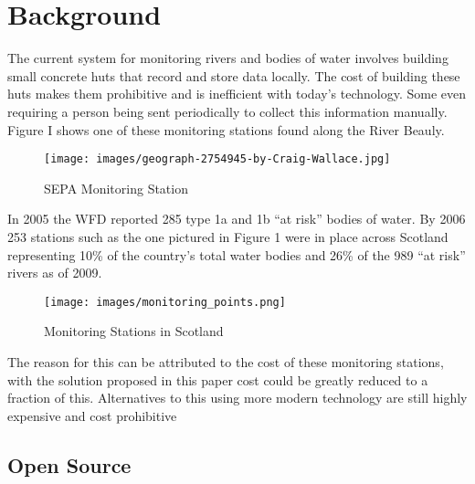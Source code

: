 \section{Background}
The current system for monitoring rivers and bodies of water involves building small concrete huts that record and store data locally. The cost of building these huts makes them prohibitive and is inefficient with today's technology. Some even requiring a person being sent periodically to collect this information manually. \citep{SEPA2018} Figure I shows one of these monitoring stations found along the River Beauly. 
\begin{figure}[H]
	\centering
	\texttt{[image: images/geograph-2754945-by-Craig-Wallace.jpg]}
	\caption{ SEPA Monitoring Station \citep{Wallace2012}}
	\label{fig:monStation}
\end{figure}
In 2005 the WFD reported 285 type 1a and 1b “at risk” bodies of water. \citep{SEPA2007} By 2006  253 stations such as the one pictured in Figure 1 were in place across Scotland representing 10\% of the country’s total water bodies and 26\% of the 989  “at risk” rivers as of 2009. \citep{SEPA2009}
\begin{figure}[H]
	\centering
	\texttt{[image: images/monitoring\_points.png]}
	\caption{ Monitoring Stations in Scotland \citep{SEPA2006}}
	\label{fig:monStations}
\end{figure}
The reason for this can be attributed to the cost of these monitoring stations, with the solution proposed in this paper cost could be greatly reduced to a fraction of this. \citep{SEPA2016} Alternatives to this using more modern technology are still highly expensive and cost prohibitive \citep{TheIoTMarketplace2015}

\subsection{Open Source}

